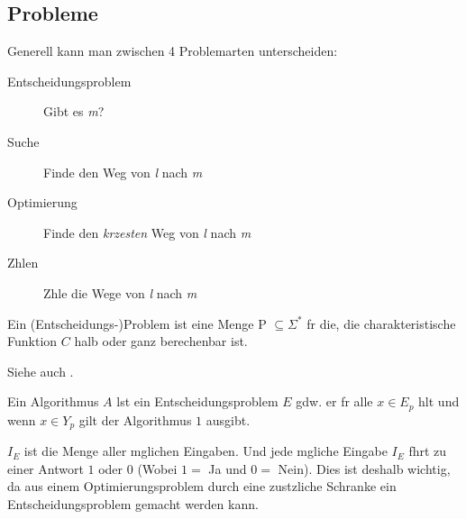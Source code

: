 \documentclass[12pt, a4paper, twoside]{scrartcl}
\begin{document}

\subsection{Probleme} %
\label{sub:probleme} 
Generell kann man zwischen 4 Problemarten unterscheiden:
\begin{description}
	\item[Entscheidungsproblem] Gibt es \emph{m}?
	\item[Suche] Finde den Weg von \emph{l} nach \emph{m}
	\item[Optimierung] Finde den \emph{krzesten} Weg von \emph{l} nach \emph{m}
	\item[Zhlen] Zhle die Wege von \emph{l} nach \emph{m}
\end{description}


\begin{definition}[Entscheidungsproblem]
	Ein (Entscheidungs-)Problem ist eine Menge P $\subseteq \Sigma^*$ fr die, die charakteristische Funktion $C$ halb oder ganz berechenbar ist.
\end{definition}

Siehe auch \cite[S. 122]{tikg}.
\begin{definition}
	[Entscheidungsalgorithmus] Ein Algorithmus $A$ lst ein Entscheidungsproblem $E$ gdw. er fr alle $x\in E_p$ hlt und wenn $x\in Y_p$ gilt der Algorithmus $1$ ausgibt. 
\end{definition}

$I_E$ ist die Menge aller mglichen Eingaben. Und jede mgliche Eingabe $I_E$ fhrt zu einer Antwort $1$ oder $0$ (Wobei $1=$ Ja und $0=$ Nein). Dies ist deshalb wichtig, da aus einem Optimierungsproblem durch eine zustzliche Schranke ein Entscheidungsproblem gemacht werden kann. 
\end{document}
